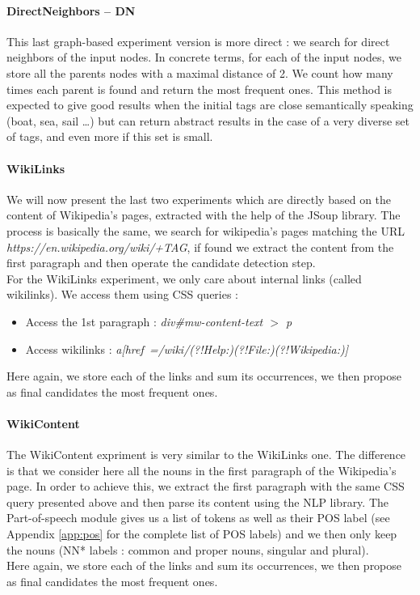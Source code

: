 \paragraph{DirectNeighbors -- DN} %
\label{par:directneighbors_dn}
This last graph-based experiment version is more direct : we search for direct neighbors of the input nodes. In concrete terms, for each of the input nodes, we store all the parents nodes with a maximal distance of 2. We count how many times each parent is found and return the most frequent ones. This method is expected to give good results when the initial tags are close semantically speaking (boat, sea, sail \dots) but can return abstract results in the case of a very diverse set of tags, and even more if this set is small.
\paragraph{WikiLinks} %
\label{par:wikilinks}
We will now present the last two experiments which are directly based on the content of Wikipedia's pages, extracted with the help of the JSoup library. The process is basically the same, we search for wikipedia's pages matching the URL \emph{https://en.wikipedia.org/wiki/+TAG}, if found we extract the content from the first paragraph and then operate the candidate detection step.\\
For the WikiLinks experiment, we only care about internal links (called wikilinks). We access them using CSS queries :
\begin{itemize}
	\item Access the 1st paragraph : \emph{div\#mw-content-text $>$ p}
	\item Access wikilinks : \emph{a[href~=/wiki/(?!Help:)(?!File:)(?!Wikipedia:)]}
\end{itemize}
Here again, we store each of the links and sum its occurrences, we then propose as final candidates the most frequent ones.
\paragraph{WikiContent} %
\label{par:wikicontent}
The WikiContent expriment is very similar to the WikiLinks one. The difference is that we consider here all the nouns in the first paragraph of the Wikipedia's page. In order to achieve this, we extract the first paragraph with the same CSS query presented above and then parse its content using the NLP library. The Part-of-speech module gives us a list of tokens as well as their POS label (see Appendix \ref{app:pos} for the complete list of POS labels) and we then only keep the nouns (NN* labels : common and proper nouns, singular and plural).\\
Here again, we store each of the links and sum its occurrences, we then propose as final candidates the most frequent ones.
